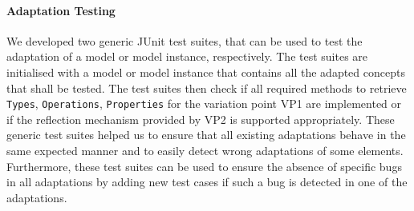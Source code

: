 	\paragraph{Adaptation Testing}
	We developed two generic JUnit test suites, 
	that can be used to test the adaptation of a model 
	or model instance, respectively. 
	The test suites are initialised with a model or model instance that
	contains all the adapted concepts that shall be tested.
	The test suites then check if all required methods to 
	retrieve \texttt{Types}, \texttt{Operations}, \texttt{Properties} for the variation point VP1 are implemented or if the reflection mechanism
	provided by VP2 is supported appropriately.
	These generic test suites helped us to ensure 
	that all existing adaptations behave in the same expected manner
	and to easily detect wrong adaptations of some elements.
	Furthermore, these test suites can be used to ensure the absence of specific
	bugs in all adaptations by adding new test cases if such a bug is detected in one of the adaptations.